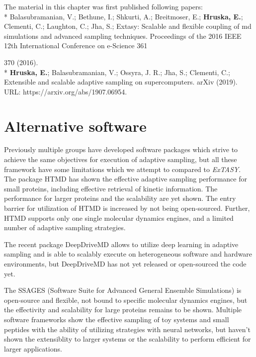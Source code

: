 The material in this chapter was first published following papers: 
\\*
\cite{Extasy2016} Balasubramanian, V.; Bethune, I.; Shkurti, A.; Breitmoser, E.; \textbf{Hruska, E.}; Clementi, C.; Laughton, C.; Jha, S.; Extasy: Scalable and flexible coupling of md simulations
and advanced sampling techniques. Proceedings of the 2016 IEEE 12th
International Conference on e-Science 361{370 (2016).
\\*
\cite{Extasy2019} \textbf{Hruska, E.}; Balasubramanian, V.; Ossyra, J. R.; Jha, S.; Clementi, C.; Extensible
and scalable adaptive sampling on supercomputers. arXiv (2019). URL: https://arxiv.org/abs/1907.06954.


\section{\label{sec:alternative4}Alternative software}

Previously multiple groups have developed software packages which strive to achieve the same objectives for execution of adaptive sampling, but all these framework have some limitations which we attempt to  compared to \emph{ExTASY}.
The package HTMD\cite{doerr2016htmd} has shown the effective adaptive sampling performance for small proteins, including effective retrieval of kinetic information. The performance for larger proteins and the scalability are yet shown. The entry barrier for utilization of HTMD is increased by not being open-sourced. Further, HTMD supports only one single molecular dynamics engines, and a limited number of adaptive sampling strategies.

The recent package DeepDriveMD \cite{leeDeepDriveMDDeepLearningDriven2019} allows to utilize deep learning in adaptive sampling and is able to scalably execute on heterogeneous software and hardware environments, but DeepDriveMD has not yet released or open-sourced the code yet. 

The SSAGES (Software Suite for Advanced General Ensemble Simulations) \cite{SSAGES} is open-source and flexible, not bound to specific molecular dynamics engines, but the effectivity and scalability for large proteins remains to be shown. Multiple software frameworks \cite{jung2019acp, ribeiro2018tjocp, bonati2019pnasu} show the effective sampling of toy systems and small peptides with the ability of utilizing strategies with neural networks, but haven't shown the extensiblity to larger systems or the scalability to perform efficient for larger applications. 

}

